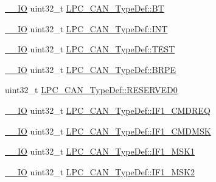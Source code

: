 \begin{DoxyCompactItemize}
\item 
\hyperlink{group___c_m_s_i_s__core__definitions_gaec43007d9998a0a0e01faede4133d6be}{\+\_\+\+\_\+\+IO} uint32\+\_\+t \hyperlink{group___l_p_c11xx___definitions_ga5c23c4ebe014434dacbc966d68846f21}{L\+P\+C\+\_\+\+C\+A\+N\+\_\+\+Type\+Def\+::\+BT}
\item 
\hyperlink{group___c_m_s_i_s__core__definitions_gaec43007d9998a0a0e01faede4133d6be}{\+\_\+\+\_\+\+IO} uint32\+\_\+t \hyperlink{group___l_p_c11xx___definitions_ga3019df722c0ccf0e0f0a3480c985d188}{L\+P\+C\+\_\+\+C\+A\+N\+\_\+\+Type\+Def\+::\+I\+NT}
\item 
\hyperlink{group___c_m_s_i_s__core__definitions_gaec43007d9998a0a0e01faede4133d6be}{\+\_\+\+\_\+\+IO} uint32\+\_\+t \hyperlink{group___l_p_c11xx___definitions_gac41d8021c6279949be65ac66cb5d35d2}{L\+P\+C\+\_\+\+C\+A\+N\+\_\+\+Type\+Def\+::\+T\+E\+ST}
\item 
\hyperlink{group___c_m_s_i_s__core__definitions_gaec43007d9998a0a0e01faede4133d6be}{\+\_\+\+\_\+\+IO} uint32\+\_\+t \hyperlink{group___l_p_c11xx___definitions_ga3b7c082aa752b35a5167f664ba74aafc}{L\+P\+C\+\_\+\+C\+A\+N\+\_\+\+Type\+Def\+::\+B\+R\+PE}
\item 
uint32\+\_\+t \hyperlink{group___l_p_c11xx___definitions_ga97aaf019e54287718e9867461d05fccb}{L\+P\+C\+\_\+\+C\+A\+N\+\_\+\+Type\+Def\+::\+R\+E\+S\+E\+R\+V\+E\+D0}
\item 
\hyperlink{group___c_m_s_i_s__core__definitions_gaec43007d9998a0a0e01faede4133d6be}{\+\_\+\+\_\+\+IO} uint32\+\_\+t \hyperlink{group___l_p_c11xx___definitions_ga45151797d18dbb4cdee027788d7dc2f6}{L\+P\+C\+\_\+\+C\+A\+N\+\_\+\+Type\+Def\+::\+I\+F1\+\_\+\+C\+M\+D\+R\+EQ}
\item 
\hyperlink{group___c_m_s_i_s__core__definitions_gaec43007d9998a0a0e01faede4133d6be}{\+\_\+\+\_\+\+IO} uint32\+\_\+t \hyperlink{group___l_p_c11xx___definitions_ga3b6c7f057c23660d4f7e07737ac841cf}{L\+P\+C\+\_\+\+C\+A\+N\+\_\+\+Type\+Def\+::\+I\+F1\+\_\+\+C\+M\+D\+M\+SK}
\item 
\hyperlink{group___c_m_s_i_s__core__definitions_gaec43007d9998a0a0e01faede4133d6be}{\+\_\+\+\_\+\+IO} uint32\+\_\+t \hyperlink{group___l_p_c11xx___definitions_gaae755f1728176c2ac1afcc2f40b1e12f}{L\+P\+C\+\_\+\+C\+A\+N\+\_\+\+Type\+Def\+::\+I\+F1\+\_\+\+M\+S\+K1}
\item 
\hyperlink{group___c_m_s_i_s__core__definitions_gaec43007d9998a0a0e01faede4133d6be}{\+\_\+\+\_\+\+IO} uint32\+\_\+t \hyperlink{group___l_p_c11xx___definitions_ga455246305e2379030ba4d9bcdc28d219}{L\+P\+C\+\_\+\+C\+A\+N\+\_\+\+Type\+Def\+::\+I\+F1\+\_\+\+M\+S\+K2}

\end{DoxyCompactItemize}
